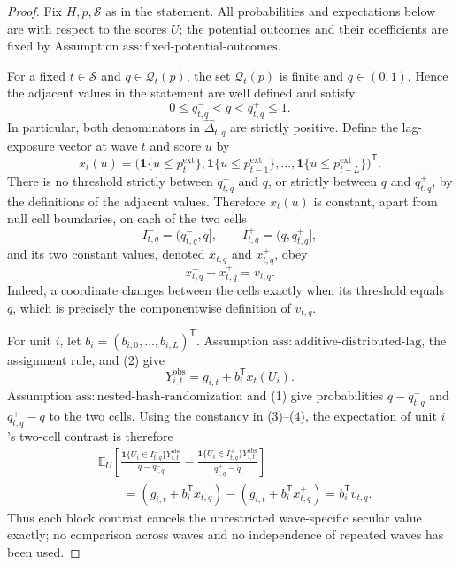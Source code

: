 \documentclass{article}
\begin{document}
\begin{proof}
Fix \(H,p,\mathcal S\) as in the statement.  All probabilities and expectations below are with respect to the scores \(U\); the potential outcomes and their coefficients are fixed by Assumption \(\mathrm{ass:fixed\text{-}potential\text{-}outcomes}\).

For a fixed \(t\in\mathcal S\) and \(q\in\mathcal Q_t(p)\), the set \(\mathcal Q_t(p)\) is finite and \(q\in(0,1)\).  Hence the adjacent values in the statement are well defined and satisfy
\[
 0\le q^-_{t,q}<q<q^+_{t,q}\le1.
\tag{1}
\]
In particular, both denominators in \(\widehat\Delta_{t,q}\) are strictly positive.  Define the lag-exposure vector at wave \(t\) and score \(u\) by
\[
 x_t(u)=\bigl(\mathbf 1\{u\le p^{\mathrm{ext}}_t\},
 \mathbf 1\{u\le p^{\mathrm{ext}}_{t-1}\},\ldots,
 \mathbf 1\{u\le p^{\mathrm{ext}}_{t-L}\}\bigr)^{\mathsf T}.
\tag{2}
\]
There is no threshold strictly between \(q^-_{t,q}\) and \(q\), or strictly between \(q\) and \(q^+_{t,q}\), by the definitions of the adjacent values.  Therefore \(x_t(u)\) is constant, apart from null cell boundaries, on each of the two cells
\[
 I^-_{t,q}=(q^-_{t,q},q],
 \qquad I^+_{t,q}=(q,q^+_{t,q}],
\]
and its two constant values, denoted \(x^-_{t,q}\) and \(x^+_{t,q}\), obey
\[
 x^-_{t,q}-x^+_{t,q}=v_{t,q}.
\tag{3}
\]
Indeed, a coordinate changes between the cells exactly when its threshold equals \(q\), which is precisely the componentwise definition of \(v_{t,q}\).

For unit \(i\), let \(b_i=(b_{i,0},\ldots,b_{i,L})^{\mathsf T}\).  Assumption \(\mathrm{ass:additive\text{-}distributed\text{-}lag}\), the assignment rule, and (2) give
\[
 Y^{\mathrm{obs}}_{i,t}=g_{i,t}+b_i^{\mathsf T}x_t(U_i).
\tag{4}
\]
Assumption \(\mathrm{ass:nested\text{-}hash\text{-}randomization}\) and (1) give probabilities \(q-q^-_{t,q}\) and \(q^+_{t,q}-q\) to the two cells.  Using the constancy in (3)--(4), the expectation of unit \(i\)'s two-cell contrast is therefore
\[
 \begin{aligned}
 &\mathbb E_U\left[
 \frac{\mathbf 1\{U_i\in I^-_{t,q}\}Y^{\mathrm{obs}}_{i,t}}
      {q-q^-_{t,q}}
 -\frac{\mathbf 1\{U_i\in I^+_{t,q}\}Y^{\mathrm{obs}}_{i,t}}
      {q^+_{t,q}-q}
 \right]\\
 &\qquad=(g_{i,t}+b_i^{\mathsf T}x^-_{t,q})
          -(g_{i,t}+b_i^{\mathsf T}x^+_{t,q})
 =b_i^{\mathsf T}v_{t,q}.
 \end{aligned}
\tag{5}
\]
Thus each block contrast cancels the unrestricted wave-specific secular value exactly; no comparison across waves and no independence of repeated waves has been used.


\end{proof}
\end{document}
